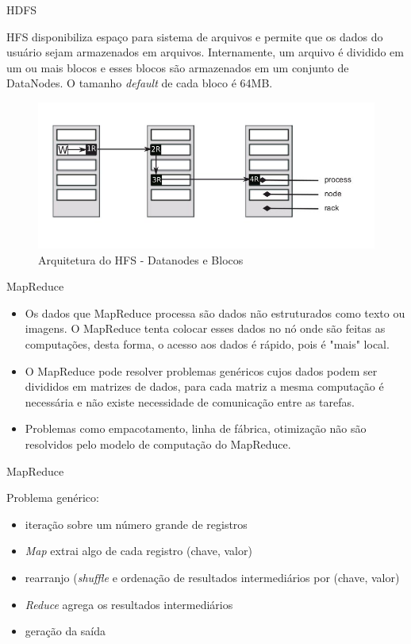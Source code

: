   \begin{frame}{HDFS}

HFS disponibiliza espaço para sistema de arquivos e permite que os dados do usuário sejam armazenados em arquivos. Internamente, um arquivo é dividido em um ou mais blocos e esses blocos são armazenados em um conjunto de DataNodes. O tamanho \emph{default} de cada bloco é 64MB.

    \begin{figure}[hb]
      \centering
      \includegraphics[scale=0.4]{HDFS-arquitetura-replicacao-2.jpg}
      \caption{Arquitetura do HFS - Datanodes e Blocos \cite{Hadoop:2010}}
      \label{fig7:hfs}
    \end{figure} 

  \end{frame}


  \begin{frame}{MapReduce}

     \begin{itemize}
       \item<1-> Os dados que MapReduce processa são dados não estruturados como texto ou imagens. O MapReduce tenta colocar esses dados no nó onde são feitas as computações, desta forma, o acesso aos dados é rápido, pois é "mais" local.
       \item<2-> O MapReduce pode resolver problemas genéricos cujos dados podem ser divididos em matrizes de dados, para cada matriz a mesma computação é necessária e não existe necessidade de comunicação entre as tarefas.
       \item<3-> Problemas como empacotamento, linha de fábrica, otimização não são resolvidos pelo modelo de computação do MapReduce.
     \end{itemize}

  \end{frame}

  \begin{frame}{MapReduce}

Problema genérico:
\begin{itemize}
   \item iteração sobre um número grande de registros
   \item \emph{Map} extrai algo de cada registro (chave, valor)
   \item rearranjo (\emph{shuffle} e ordenação de resultados intermediários por (chave, valor)
   \item \emph{Reduce} agrega os resultados intermediários 
   \item geração da saída
\end{itemize}

  \end{frame}

